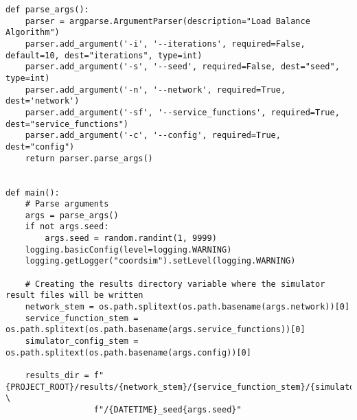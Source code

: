 \begin{lstlisting}
def parse_args():
    parser = argparse.ArgumentParser(description="Load Balance Algorithm")
    parser.add_argument('-i', '--iterations', required=False, default=10, dest="iterations", type=int)
    parser.add_argument('-s', '--seed', required=False, dest="seed", type=int)
    parser.add_argument('-n', '--network', required=True, dest='network')
    parser.add_argument('-sf', '--service_functions', required=True, dest="service_functions")
    parser.add_argument('-c', '--config', required=True, dest="config")
    return parser.parse_args()


def main():
    # Parse arguments
    args = parse_args()
    if not args.seed:
        args.seed = random.randint(1, 9999)
    logging.basicConfig(level=logging.WARNING)
    logging.getLogger("coordsim").setLevel(logging.WARNING)

    # Creating the results directory variable where the simulator result files will be written
    network_stem = os.path.splitext(os.path.basename(args.network))[0]
    service_function_stem = os.path.splitext(os.path.basename(args.service_functions))[0]
    simulator_config_stem = os.path.splitext(os.path.basename(args.config))[0]

    results_dir = f"{PROJECT_ROOT}/results/{network_stem}/{service_function_stem}/{simulator_config_stem}" \
                  f"/{DATETIME}_seed{args.seed}"


\end{lstlisting}
